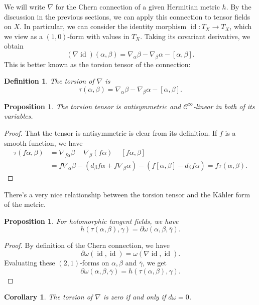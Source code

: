 \documentclass[10pt,a4paper]{article}
\newtheorem{prop}[theo]{Proposition}
\newtheorem{coro}[theo]{Corollary}
\newtheorem{defi}[theo]{Definition}
\newtheorem*{proof}{Proof}
\newcommand{\cc}[1]{\mathcal{#1}}
\def\qedhere{}
\DeclareMathOperator{\id}{id}
\begin{document}
We will write $\nabla$ for the Chern connection of a given Hermitian metric $h$. By the discussion in the previous sections, we can apply this connection to tensor fields on $X$. In particular, we can consider the identity morphism $\id : T_X \to T_X$, which we view as a $(1,0)$-form with values in $T_X$. Taking its covariant derivative, we obtain
$$
(\nabla \id)(\alpha, \beta)
= \nabla_\alpha \beta - \nabla_\beta \alpha - [\alpha, \beta].
$$
This is better known as the torsion tensor of the connection:

\begin{defi}
The \emph{torsion} of $\nabla$ is
$$
\tau(\alpha,\beta)
= \nabla_\alpha \beta - \nabla_\beta \alpha - [\alpha, \beta].
$$
\end{defi}

\begin{prop}
The torsion tensor is antisymmetric and $\cc C^\infty$-linear in both of its variables.
\end{prop}

\begin{proof}
  That the tensor is antisymmetric is clear from its definition. If $f$ is a smooth function, we have
\begin{align*}
\tau(f\alpha,\beta)
&= \nabla_{f\alpha}\beta - \nabla_\beta(f\alpha) - [f\alpha,\beta]
\\
&= f\nabla_\alpha \beta - (d_\beta f \alpha + f \nabla_\beta \alpha) - (f[\alpha,\beta] - d_\beta f \alpha)
= f \tau(\alpha,\beta).
\qedhere
\end{align*}
\end{proof}

There's a very nice relationship between the torsion tensor and the K\"ahler form of the metric.

\begin{prop}
For holomorphic tangent fields, we have
$$
h(\tau(\alpha,\beta), \gamma)
= \partial\omega(\alpha,\beta,\overline\gamma).
$$
\end{prop}

\begin{proof}
By definition of the Chern connection, we have
$$
\partial \omega(\id, \id)
= \omega(\nabla \id, \id).
$$
Evaluating these $(2,1)$-forms on $\alpha, \beta$ and $\overline\gamma$, we get
\[
\partial\omega(\alpha,\beta,\overline{\gamma})
= h(\tau(\alpha,\beta), \gamma).
\qedhere
\]
\end{proof}

\begin{coro}
\label{coro:kahler-zero-torsion}
The torsion of $\nabla$ is zero if and only if $d\omega = 0$.
\end{coro}
\end{document}
